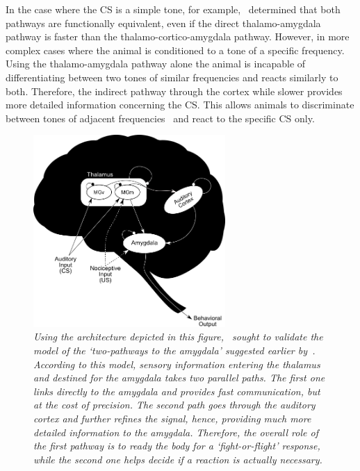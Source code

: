 In the case where the CS is a simple tone, for example,~\citet{Romanski1992} determined that both pathways are functionally equivalent, even if the direct thalamo-amygdala pathway is faster than the thalamo-cortico-amygdala pathway. However, in more complex cases where the animal is conditioned to a tone of a specific frequency. Using the thalamo-amygdala pathway alone the animal is incapable of differentiating between two tones of similar frequencies and reacts similarly to both. Therefore, the indirect pathway through the cortex while slower provides more detailed information concerning the CS\@. This allows animals to discriminate between tones of adjacent frequencies~\supercite{Romanski1992} and react to the specific CS only.

\begin{figure}[!htbp]
\centering
\includegraphics[width=0.65\textwidth]{Figs/armony}
\caption{\textit{Using the architecture depicted in this figure,~\citet{Armony1995} sought to validate the model of the `\emph{two-pathways to the amygdala}' suggested earlier by~\citet{Ledoux1992}. According to this model, sensory information entering the thalamus and destined for the amygdala takes two parallel paths. The first one links directly to the amygdala and provides fast communication, but at the cost of precision. The second path goes through the auditory cortex and further refines the signal, hence, providing much more detailed information to the amygdala. Therefore, the overall role of the first pathway is to ready the body for a `\emph{fight-or-flight}' response, while the second one helps decide if a reaction is actually necessary.}}\label{fig:armony}
\end{figure}

